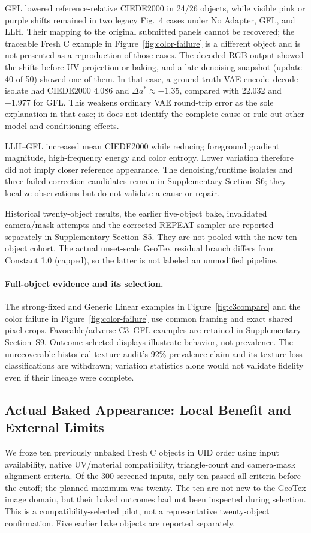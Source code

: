 \documentclass[times,twocolumn,final]{elsarticle}
\begin{document}
GFL lowered reference-relative CIEDE2000 in 24/26 objects, while visible pink or purple shifts remained in two legacy Fig.~4 cases under No Adapter, GFL, and LLH. Their mapping to the original submitted panels cannot be recovered; the traceable Fresh C example in Figure~\ref{fig:color-failure} is a different object and is not presented as a reproduction of those cases. The decoded RGB output showed the shifts before UV projection or baking, and a late denoising snapshot (update 40 of 50) showed one of them. In that case, a ground-truth VAE encode--decode isolate had CIEDE2000 4.086 and $\Delta a^*\approx-1.35$, compared with 22.032 and $+1.977$ for GFL. This weakens ordinary VAE round-trip error as the sole explanation in that case; it does not identify the complete cause or rule out other model and conditioning effects.

LLH--GFL increased mean CIEDE2000 while reducing foreground gradient magnitude, high-frequency energy and color entropy. Lower variation therefore did not imply closer reference appearance. The denoising/runtime isolates and three failed correction candidates remain in Supplementary Section~S6; they localize observations but do not validate a cause or repair.

Historical twenty-object results, the earlier five-object bake, invalidated camera/mask attempts and the corrected REPEAT sampler are reported separately in Supplementary Section~S5. They are not pooled with the new ten-object cohort. The actual unset-scale GeoTex residual branch differs from Constant 1.0 (capped), so the latter is not labeled an unmodified pipeline.

\paragraph{Full-object evidence and its selection.}
The strong-fixed and Generic Linear examples in Figure~\ref{fig:c3compare} and the color failure in Figure~\ref{fig:color-failure} use common framing and exact shared pixel crops. Favorable/adverse C3--GFL examples are retained in Supplementary Section~S9. Outcome-selected displays illustrate behavior, not prevalence. The unrecoverable historical texture audit's 92\% prevalence claim and its texture-loss classifications are withdrawn; variation statistics alone would not validate fidelity even if their lineage were complete.


\subsection{Actual Baked Appearance: Local Benefit and External Limits}
\label{subsec:new-bake}
We froze ten previously unbaked Fresh C objects in UID order using input availability, native UV/material compatibility, triangle-count and camera-mask alignment criteria. Of the 300 screened inputs, only ten passed all criteria before the cutoff; the planned maximum was twenty. The ten are not new to the GeoTex image domain, but their baked outcomes had not been inspected during selection. This is a compatibility-selected pilot, not a representative twenty-object confirmation. Five earlier bake objects are reported separately.
\end{document}
